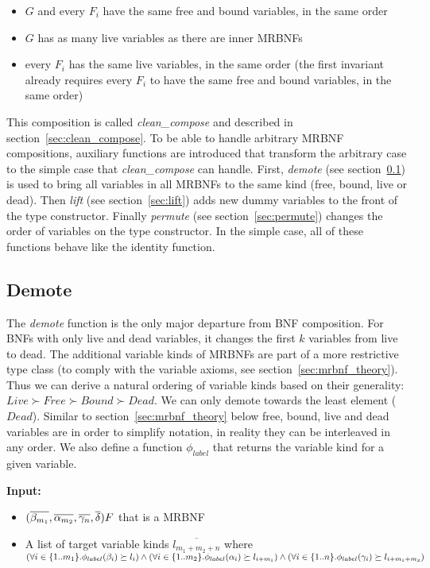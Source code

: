 \begin{itemize}
\item{$G$ and every $F_i$ have the same free and bound variables, in the same order}
\item{$G$ has as many live variables as there are inner \acp{MRBNF}}
\item{every $F_i$ has the same live variables, in the same order (the first invariant already requires every $F_i$ to have the same free and bound variables, in the same order)}
\end{itemize}

This composition is called \textit{clean\_compose} and described in section~\ref{sec:clean_compose}. To be able to handle arbitrary \ac{MRBNF} compositions, auxiliary functions are introduced that transform the arbitrary case to the simple case that \textit{clean\_compose} can handle. First, \textit{demote} (see section~\ref{sec:demote}) is used to bring all variables in all \acp{MRBNF} to the same kind (free, bound, live or dead). Then \textit{lift} (see section~\ref{sec:lift}) adds new dummy variables to the front of the type constructor. Finally \textit{permute} (see section~\ref{sec:permute}) changes the order of variables on the type constructor. In the simple case, all of these functions behave like the identity function.

\subsection{Demote}\label{sec:demote}

The \textit{demote} function is the only major departure from \ac{BNF} composition. For \acp{BNF} with only live and dead variables, it changes the first $k$ variables from live to dead. The additional variable kinds of \acp{MRBNF} are part of a more restrictive type class (to comply with the variable axioms, see section~\ref{sec:mrbnf_theory}). Thus we can derive a natural ordering of variable kinds based on their generality: $Live \succ Free \succ Bound \succ Dead$. We can only demote towards the least element ($Dead$). Similar to section~\ref{sec:mrbnf_theory} below free, bound, live and dead variables are in order to simplify notation, in reality they can be interleaved in any order. We also define a function $\phi_{label}$ that returns the variable kind for a given variable.

\newcommand{\lab}[1]{\phi_{label}(#1)}

\vspace*{1em}
\noindent
\textbf{Input:}
\begin{itemize}
\item{$(\overline{\beta_{m_1}}, \overline{\alpha_{m_2}}, \overline{\gamma_n}, \overline{\delta}) F$ that is a \ac{MRBNF}}
\item{A list of target variable kinds $\overline{l_{m_1+m_2+n}}$ where $(\forall i \in \{1..m_1\}. \lab{\beta_i} \succeq l_i) \wedge \\
(\forall i \in \{1..m_2\}. \lab{\alpha_i} \succeq l_{i+m_1}) \wedge (\forall i \in \{1..n\}. \lab{\gamma_i} \succeq l_{i+m_1+m_2})$}
\end{itemize}

